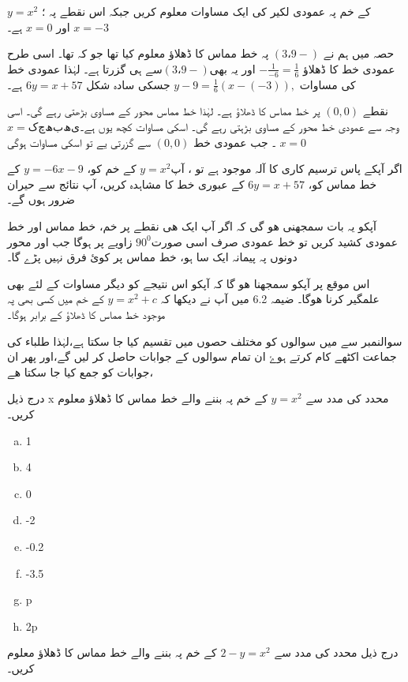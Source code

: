  \( y=x^{2} \)   
 کے خم پہ  عمودی لکیر کی ایک مساوات معلوم کریں جبکہ اس نقطے پہ ؛\(x=-3\) اور \(x=0\)  ہے۔

  حصہ میں ہم نے \(  (3،9-)   \) پہ خط مماس  کا ڈھلاؤ معلوم کیا تھا جو کہ  تھا۔ اسی طرح عمودی خط کا ڈھلاؤ \(-\frac{1}{-6} =\frac{1}{6}\) اور یہ بھی\(  (3،9-)   \)سے ہی گزرتا ہے۔ لہٰذا عمودی خط کی مساوات \( y-9=\frac{1}{6}(x-(-3)),\) جسکی سادہ شکل
\( 6y=x+57\)
ہے۔

نقطے \( (0,0)\)  پر خط مماس کا ڈھلاؤ ہے۔ لہٰذا  خط مماس محور کے مساوی بڑھتی رہے گی۔ اسی وجہ سے عمودی خط  محور کے مساوی بڑہتی رہے گی۔ اسکی مساوات کچھ یوں ہے۔\(x= کچھ بھی \)   ۔ جب عمودی خط \( (0,0)\)  سے گزرتی یے تو اسکی  مساوات ہوگی \(x= 0 \) 

اگر آپکے پاس ترسیم کاری کا آلہ موجود ہے تو ، آپ\( y=x^{2}  \) کے خم کو، \( y=-6x-9  \) کے خط مماس کو، \( 6y=x+57  \) کے عبوری خط کا مشاہدہ کریں، آپ نتائج سے حیران ضرور ہوں گے۔

آپکو یہ بات سمجھنی ھو گی کہ اگر آپ ایک ھی نقطے پر خم، خط مماس اور خط عمودی کشید کریں تو خط عمودی صرف اسی صورت\(90^0\) زاویے پر ہوگا جب   اور   محور دونوں پہ پیمانہ ایک سا ہو، خط مماس پر کوئ فرق نہیں پڑے گا۔  

اس موقع پر آپکو سمجھنا ھو گا کہ آپکو اس نتیجے کو دیگر مساوات کے لئے بھی علمگیر کرنا ھوگا۔ ضیمہ 6.2 میں آپ نے دیکھا کہ \( y=x^{2} +c \) کے خم میں کسی بھی پہ موجود خط مماس کا ڈھلاؤ  کے برابر ہوگا۔



سوالنمبر  سے  میں سوالوں کو مختلف حصوں میں تقسیم کیا جا سکتا ہے،لہٰذا طلباء کی جماعت اکٹھے کام کرتے ہوۓ ان تمام سوالوں کے جوابات حاصل کر لیں گے،اور پھر ان جوابات کو جمع کیا جا سکتا ھے،

درج ذیل x محدد کی مدد سے \( y=x^{2}\)  کے خم پہ   بننے والے خط مماس کا ڈھلاؤ معلوم کریں۔ 
\begin{enumerate}[a.]
\item 1
\item4
\item0
\item-2
\item-0.2
\item-3.5
\item p
\item 2p
\end{enumerate}


درج ذیل محدد کی مدد سے \(2- y=x^{2}\)  کے خم پہ   بننے والے خط مماس کا ڈھلاؤ معلوم کریں۔ 

